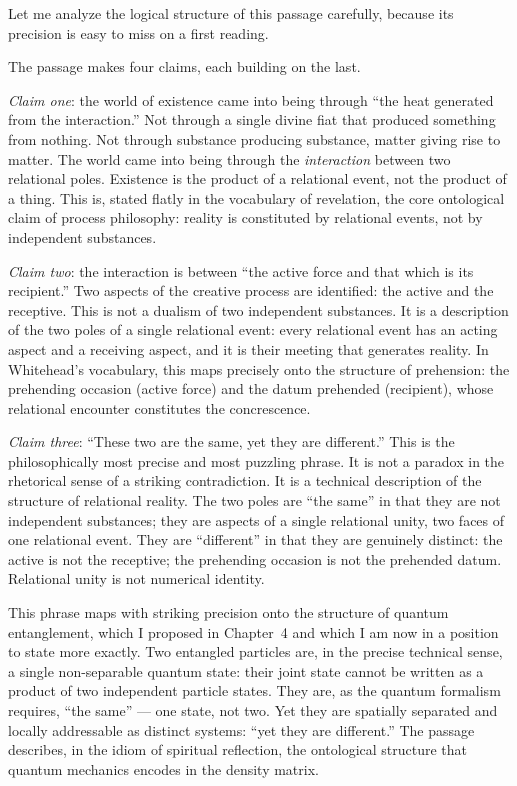 Let me analyze the logical structure of this passage carefully, because its
precision is easy to miss on a first reading.

The passage makes four claims, each building on the last.

\emph{Claim one}: the world of existence came into being through ``the heat
generated from the interaction.''
Not through a single divine fiat that produced something from nothing.
Not through substance producing substance, matter giving rise to matter.
The world came into being through the \emph{interaction} between two relational
poles.
Existence is the product of a relational event, not the product of a thing.
This is, stated flatly in the vocabulary of revelation, the core ontological claim
of process philosophy: reality is constituted by relational events, not by
independent substances.

\emph{Claim two}: the interaction is between ``the active force and that which is
its recipient.''
Two aspects of the creative process are identified: the active and the receptive.
This is not a dualism of two independent substances.
It is a description of the two poles of a single relational event: every relational
event has an acting aspect and a receiving aspect, and it is their meeting that
generates reality.
In Whitehead's vocabulary, this maps precisely onto the structure of prehension:
the prehending occasion (active force) and the datum prehended (recipient), whose
relational encounter constitutes the concrescence.

\emph{Claim three}: ``These two are the same, yet they are different.''
This is the philosophically most precise and most puzzling phrase.
It is not a paradox in the rhetorical sense of a striking contradiction.
It is a technical description of the structure of relational reality.
The two poles are ``the same'' in that they are not independent substances; they
are aspects of a single relational unity, two faces of one relational event.
They are ``different'' in that they are genuinely distinct: the active is not
the receptive; the prehending occasion is not the prehended datum.
Relational unity is not numerical identity.

This phrase maps with striking precision onto the structure of quantum entanglement,
which I proposed in Chapter~4 and which I am now in a position to state more exactly.
Two entangled particles are, in the precise technical sense, a single non-separable
quantum state: their joint state cannot be written as a product of two independent
particle states.
They are, as the quantum formalism requires, ``the same'' --- one state, not two.
Yet they are spatially separated and locally addressable as distinct systems:
``yet they are different.''
The passage describes, in the idiom of spiritual reflection, the ontological
structure that quantum mechanics encodes in the density matrix.

